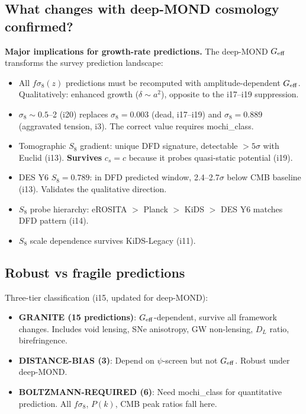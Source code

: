 \documentclass[11pt]{article}
\begin{document}
\subsection{What changes with deep-MOND cosmology confirmed?}

\textbf{Major implications for growth-rate predictions.} The deep-MOND $G_{\rm eff}$
transforms the survey prediction landscape:

\begin{itemize}
\item All $f\sigma_8(z)$ predictions must be recomputed with amplitude-dependent
$G_{\rm eff}$. Qualitatively: enhanced growth ($\delta \sim a^2$), opposite to
the i17--i19 suppression.
\item $\sigma_8 \sim 0.5$--2 (i20) replaces $\sigma_8 = 0.003$ (dead, i17--i19)
and $\sigma_8 = 0.889$ (aggravated tension, i3). The correct value requires mochi\_class.
\item Tomographic $S_8$ gradient: unique DFD signature, detectable $>5\sigma$ with
Euclid (i13). \textbf{Survives} $c_s = c$ because it probes quasi-static potential (i19).
\item DES Y6 $S_8 = 0.789$: in DFD predicted window, 2.4--2.7$\sigma$ below CMB
baseline (i13). Validates the qualitative direction.
\item $S_8$ probe hierarchy: eROSITA $>$ Planck $>$ KiDS $>$ DES Y6 matches DFD
pattern (i14).
\item $S_8$ scale dependence survives KiDS-Legacy (i11).
\end{itemize}

\subsection{Robust vs fragile predictions}

Three-tier classification (i15, updated for deep-MOND):
\begin{itemize}
\item \textbf{GRANITE (15 predictions)}: $G_{\rm eff}$-dependent, survive all
framework changes. Includes void lensing, SNe anisotropy, GW non-lensing,
$D_L$ ratio, birefringence.
\item \textbf{DISTANCE-BIAS (3)}: Depend on $\psi$-screen but not $G_{\rm eff}$.
Robust under deep-MOND.
\item \textbf{BOLTZMANN-REQUIRED (6)}: Need mochi\_class for quantitative prediction.
All $f\sigma_8$, $P(k)$, CMB peak ratios fall here.
\end{itemize}
\end{document}

